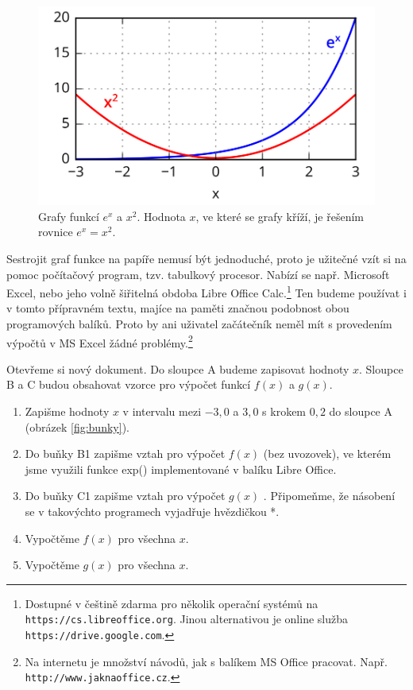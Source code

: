 \documentclass[a4paper,oneside,12pt]{article}
\begin{document}
\begin{figure}
\begin{center}
\includegraphics{./IMGS/krizeni-drawing.png}
\end{center}
\caption{Grafy funkcí $e^x$ a $x^2$. Hodnota $x$, ve které
se grafy kříží, je řešením rovnice $e^x=x^2$.}
\label{fig:krizeni}
\end{figure}
%
Sestrojit graf funkce na papíře nemusí být jednoduché, proto
je užitečné vzít si na pomoc počítačový program, tzv. tabulkový
procesor. Nabízí se např. Microsoft Excel, nebo jeho volně
šiřitelná obdoba Libre Office Calc.\footnote{Dostupné 
v češtině zdarma pro několik operační systémů 
na \texttt{https://cs.libreoffice.org}. Jinou alternativou je online
služba \texttt{https://drive.google.com}.} Ten budeme používat i 
v tomto přípravném textu, majíce na paměti značnou podobnost obou 
programových balíků. Proto by ani uživatel začátečník neměl
mít s provedením výpočtů v MS Excel žádné
problémy.\footnote{Na internetu je množství návodů, jak 
s balíkem MS Office pracovat. 
Např. \texttt{http://www.jaknaoffice.cz}.}

Otevřeme si nový dokument. Do sloupce A budeme zapisovat
hodnoty $x$. Sloupce B a C budou obsahovat vzorce pro výpočet 
funkcí $f(x)$ a $g(x)$.

\begin{enumerate}
\item Zapišme hodnoty $x$ v intervalu mezi $-3,0$ a $3,0$ s 
krokem $0,2$ do sloupce A (obrázek \ref{fig:bunky}).
\item Do buňky B1 zapišme vztah pro výpočet $f(x)$ 
(bez uvozovek), ve kterém jsme využili funkce exp() 
implementované v balíku Libre Office.
\item Do buňky C1 zapišme vztah pro výpočet $g(x)$ .
Připomeňme, že násobení se v takovýchto programech vyjadřuje 
hvězdičkou *.
\item Vypočtěme $f(x)$ pro všechna $x$.
\item Vypočtěme $g(x)$ pro všechna $x$.
\end{enumerate}
\end{document}
